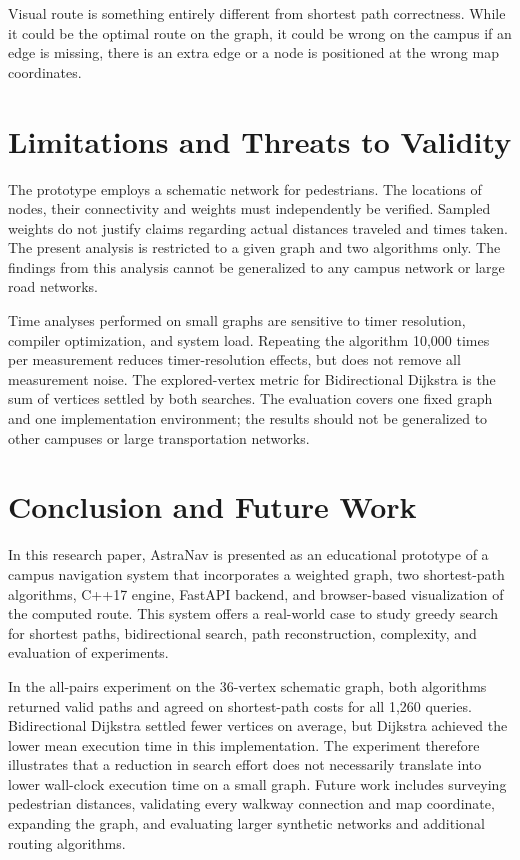 \documentclass[conference]{IEEEtran}
\begin{document}
Visual route is something entirely different from shortest path correctness. While it could be the optimal route on the graph, it could be wrong on the campus if an edge is missing, there is an extra edge or a node is positioned at the wrong map coordinates.

\section{Limitations and Threats to Validity}
The prototype employs a schematic network for pedestrians. The locations of nodes, their connectivity and weights must independently be verified. Sampled weights do not justify claims regarding actual distances traveled and times taken. The present analysis is restricted to a given graph and two algorithms only. The findings from this analysis cannot be generalized to any campus network or large road networks.

Time analyses performed on small graphs are sensitive to timer resolution, compiler optimization, and system load. Repeating the algorithm 10,000 times per measurement reduces timer-resolution effects, but does not remove all measurement noise. The explored-vertex metric for Bidirectional Dijkstra is the sum of vertices settled by both searches. The evaluation covers one fixed graph and one implementation environment; the results should not be generalized to other campuses or large transportation networks.
\section{Conclusion and Future Work}
In this research paper, AstraNav is presented as an educational prototype of a campus navigation system that incorporates a weighted graph, two shortest-path algorithms, C++17 engine, FastAPI backend, and browser-based visualization of the computed route. This system offers a real-world case to study greedy search for shortest paths, bidirectional search, path reconstruction, complexity, and evaluation of experiments.

In the all-pairs experiment on the 36-vertex schematic graph, both algorithms returned valid paths and agreed on shortest-path costs for all 1,260 queries. Bidirectional Dijkstra settled fewer vertices on average, but Dijkstra achieved the lower mean execution time in this implementation. The experiment therefore illustrates that a reduction in search effort does not necessarily translate into lower wall-clock execution time on a small graph. Future work includes surveying pedestrian distances, validating every walkway connection and map coordinate, expanding the graph, and evaluating larger synthetic networks and additional routing algorithms.
\end{document}
